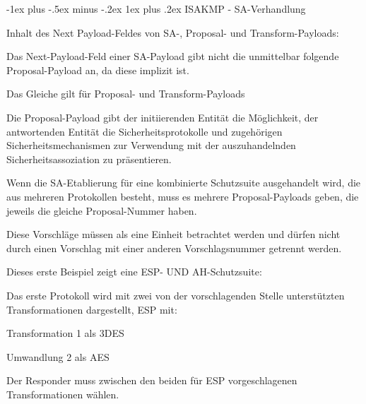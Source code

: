 \documentclass[a4paper]{article}
\makeatletter
\renewcommand{\subsubsection}{\@startsection{subsubsection}{3}{0mm}%
 {-1ex plus -.5ex minus -.2ex}%
 {1ex plus .2ex}%
 {\normalfont\small\bfseries}}
\makeatother
\begin{document}
\begin{multicols}{3}
\begin{itemize*}
            \subsubsection{ISAKMP - SA-Verhandlung}
            \begin{itemize*}
                  \item Inhalt des Next Payload-Feldes von SA-, Proposal- und
                  Transform-Payloads:
                  \begin{itemize*}
                        \item Das Next-Payload-Feld einer SA-Payload gibt nicht die unmittelbar folgende Proposal-Payload an, da diese implizit ist.
                        \item Das Gleiche gilt für Proposal- und Transform-Payloads
                  \end{itemize*}
                  \item Die Proposal-Payload gibt der initiierenden Entität die Möglichkeit,
                  der antwortenden Entität die Sicherheitsprotokolle und zugehörigen
                  Sicherheitsmechanismen zur Verwendung mit der auszuhandelnden
                  Sicherheitsassoziation zu präsentieren.
                  \item Wenn die SA-Etablierung für eine kombinierte Schutzsuite ausgehandelt
                  wird, die aus mehreren Protokollen besteht, muss es mehrere
                  Proposal-Payloads geben, die jeweils die gleiche Proposal-Nummer
                  haben.
                  \item Diese Vorschläge müssen als eine Einheit betrachtet werden und dürfen
                  nicht durch einen Vorschlag mit einer anderen Vorschlagsnummer
                  getrennt werden.
                  \item Dieses erste Beispiel zeigt eine ESP- UND AH-Schutzsuite:
                  \begin{itemize*}
                        \item Das erste Protokoll wird mit zwei von der vorschlagenden Stelle unterstützten Transformationen dargestellt, ESP mit:
                        \begin{itemize*} \item Transformation 1 als 3DES \item Umwandlung 2 als AES \item Der Responder muss zwischen den beiden für ESP vorgeschlagenen Transformationen wählen. \end{itemize*}

\end{itemize*}
\end{itemize*}
\end{itemize*}
\end{multicols}
\end{document}
